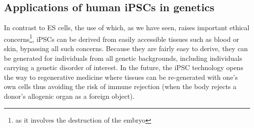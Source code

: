 




\subsection{Applications of human iPSCs in genetics}
\label{sec:ips_genetics}

In contrast to ES cells, the use of which, as we have seen, raises important ethical concerns\footnote{as it involves the destruction of the embryo}, iPSCs
can be derived from easily accessible tissues such as blood or skin, bypassing all such concerns.
Because they are fairly easy to derive, they can be generated for individuals from all genetic backgrounds, including individuals carrying a genetic disorder of interest.
In the future, the iPSC technology opens the way to regenerative medicine where tissues can be re-generated with one's own cells thus avoiding the risk of immune rejection (when the body rejects a donor's allogenic organ as a foreign object).\\

